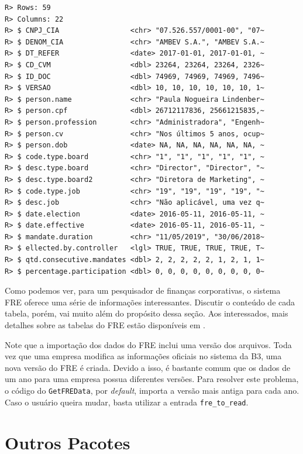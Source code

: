 \documentclass[
  11pt,
]{book}
\newenvironment{rmdimportant}
{\begin{importantblock}

	} {\end{importantblock}}
\begin{document}
\begin{verbatim}
R> Rows: 59
R> Columns: 22
R> $ CNPJ_CIA                 <chr> "07.526.557/0001-00", "07~
R> $ DENOM_CIA                <chr> "AMBEV S.A.", "AMBEV S.A.~
R> $ DT_REFER                 <date> 2017-01-01, 2017-01-01, ~
R> $ CD_CVM                   <dbl> 23264, 23264, 23264, 2326~
R> $ ID_DOC                   <dbl> 74969, 74969, 74969, 7496~
R> $ VERSAO                   <dbl> 10, 10, 10, 10, 10, 10, 1~
R> $ person.name              <chr> "Paula Nogueira Lindenber~
R> $ person.cpf               <dbl> 26712117836, 25661215835,~
R> $ person.profession        <chr> "Administradora", "Engenh~
R> $ person.cv                <chr> "Nos últimos 5 anos, ocup~
R> $ person.dob               <date> NA, NA, NA, NA, NA, NA, ~
R> $ code.type.board          <chr> "1", "1", "1", "1", "1", ~
R> $ desc.type.board          <chr> "Director", "Director", "~
R> $ desc.type.board2         <chr> "Diretora de Marketing", ~
R> $ code.type.job            <chr> "19", "19", "19", "19", "~
R> $ desc.job                 <chr> "Não aplicável, uma vez q~
R> $ date.election            <date> 2016-05-11, 2016-05-11, ~
R> $ date.effective           <date> 2016-05-11, 2016-05-11, ~
R> $ mandate.duration         <chr> "11/05/2019", "30/06/2018~
R> $ ellected.by.controller   <lgl> TRUE, TRUE, TRUE, TRUE, T~
R> $ qtd.consecutive.mandates <dbl> 2, 2, 2, 2, 2, 1, 2, 1, 1~
R> $ percentage.participation <dbl> 0, 0, 0, 0, 0, 0, 0, 0, 0~
\end{verbatim}

Como podemos ver, para um pesquisador de finanças corporativas, o sistema FRE oferece uma série de informações interessantes. Discutir o conteúdo de cada tabela, porém, vai muito além do propósito dessa seção. Aos interessados, mais detalhes sobre as tabelas do FRE estão disponíveis em \citet{perlin2018accessing}.

\begin{rmdimportant}
Note que a importação dos dados do FRE inclui uma versão dos arquivos.
Toda vez que uma empresa modifica as informações oficiais no sistema da
B3, uma nova versão do FRE é criada. Devido a isso, é bastante comum que
os dados de um ano para uma empresa possua diferentes versões. Para
resolver este problema, o código do \texttt{GetFREData}, por
\emph{default}, importa a versão mais antiga para cada ano. Caso o
usuário queira mudar, basta utilizar a entrada \texttt{fre\_to\_read}.
\end{rmdimportant}

\hypertarget{outros-pacotes}{%
\section{Outros Pacotes}\label{outros-pacotes}}
\end{document}
